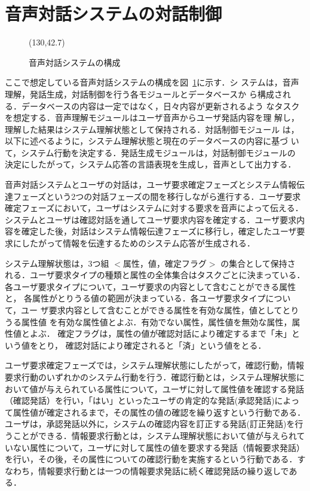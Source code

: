 \section{音声対話システムの対話制御}
\label{sec-system}

\begin{figure}[t]
\begin{center}
\atari(130,42.7)
\end{center}
\caption{音声対話システムの構成}
\label{fig-system} 
\end{figure}

ここで想定している音声対話システムの構成を図~\ref{fig-system}に示す．シ
ステムは，音声理解，発話生成，対話制御を行う各モジュールとデータベースか
ら構成される．データベースの内容は一定ではなく，日々内容が更新されるよう
なタスクを想定する．音声理解モジュールはユーザ音声からユーザ発話内容を理
解し，理解した結果はシステム理解状態として保持される．対話制御モジュール
は，以下に述べるように，システム理解状態と現在のデータベースの内容に基づ
いて，システム行動を決定する．発話生成モジュールは，対話制御モジュールの
決定にしたがって，システム応答の言語表現を生成し，音声として出力する．

音声対話システムとユーザの対話は，ユーザ要求確定フェーズとシステム情報伝
達フェーズという2つの対話フェーズの間を移行しながら進行する．ユーザ要求
確定フェーズにおいて，ユーザはシステムに対する要求を音声によって伝える．
システムとユーザは確認対話を通してユーザ要求内容を確定する．ユーザ要求内
容を確定した後，対話はシステム情報伝達フェーズに移行し，確定したユーザ要
求にしたがって情報を伝達するためのシステム応答が生成される．

システム理解状態は，3つ組 $<$属性，値，確定フラグ$>$ の集合として保持さ
れる．ユーザ要求タイプの種類と属性の全体集合はタスクごとに決まっている．
各ユーザ要求タイプについて，ユーザ要求の内容として含むことができる属性と，
各属性がとりうる値の範囲が決まっている．各ユーザ要求タイプについて，ユー
ザ要求内容として含むことができる属性を有効な属性，値としてとりうる属性値
を有効な属性値とよぶ．有効でない属性，属性値を無効な属性，属性値とよぶ．
確定フラグは，属性の値が確認対話により確定するまで「未」という値をとり，
確認対話により確定されると「済」という値をとる．

ユーザ要求確定フェーズでは，システム理解状態にしたがって，確認行動，情報
要求行動のいずれかのシステム行動を行う．確認行動とは，システム理解状態に
おいて値が与えられている属性について，ユーザに対して属性値を確認する発話
（確認発話）を行い，「はい」といったユーザの肯定的な発話(承認発話)によっ
て属性値が確定されるまで，その属性の値の確認を繰り返すという行動である．
ユーザは，承認発話以外に，システムの確認内容を訂正する発話(訂正発話)を行
うことができる．情報要求行動とは，システム理解状態において値が与えられて
いない属性について，ユーザに対して属性の値を要求する発話（情報要求発話）
を行い，その後，その属性についての確認行動を実施するという行動である．す
なわち，情報要求行動とは一つの情報要求発話に続く確認発話の繰り返しである．

